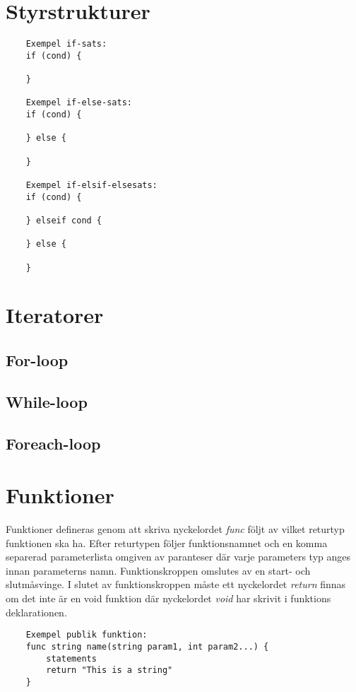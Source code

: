\documentclass{TDP003mall}
\begin{document}
    \section{Styrstrukturer}
\begin{verbatim}
    Exempel if-sats:
    if (cond) {
      
    }

    Exempel if-else-sats:
    if (cond) {
      
    } else {

    }

    Exempel if-elsif-elsesats:
    if (cond) {
      
    } elseif cond {

    } else {

    }
\end{verbatim}

\section{Iteratorer}

\subsection{For-loop}

\subsection{While-loop}

\subsection{Foreach-loop}

    \section{Funktioner}
    Funktioner defineras genom att skriva nyckelordet \emph{func} följt av vilket returtyp funktionen ska ha. Efter returtypen följer funktionsnamnet och en komma separerad parameterlista omgiven av paranteser där varje parameters typ anges innan parameterns namn. Funktionskroppen omslutes av en start- och slutmåsvinge. I slutet av funktionskroppen måste ett nyckelordet \emph{return} finnas om det inte är en void funktion där nyckelordet \emph{void} har skrivit i funktions deklarationen.

    \begin{verbatim}
    Exempel publik funktion:
    func string name(string param1, int param2...) {
        statements
        return "This is a string"
    }  
\end{verbatim}
    
\end{document}
